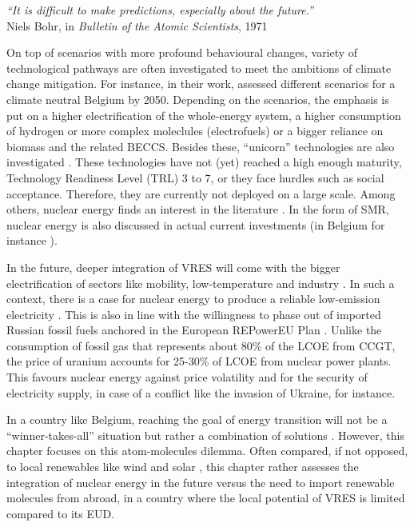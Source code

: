 \vspace{-0.2cm}
\begin{flushright}
\emph{``It is difficult to make predictions, especially about the future.''}\\
Niels Bohr, in \textit{Bulletin of the Atomic Scientists}, 1971
\end{flushright}
\vspace{0.4cm}

On top of scenarios with more profound behavioural changes, variety of technological pathways are often investigated to meet the ambitions of climate change mitigation. For instance, in their work, \citet{My2050} assessed different scenarios for a climate neutral Belgium by 2050. Depending on the scenarios, the emphasis is put on a higher electrification of the whole-energy system, a higher consumption of hydrogen or more complex moleclules (\ie electrofuels) or a bigger reliance on biomass and the related \gls{BECCS}. Besides these, ``unicorn'' technologies are also investigated \cite{heuberger2018impact}. These technologies have not (yet) reached a high enough maturity, \ie Technology Readiness Level (TRL) 3 to 7, or they face hurdles such as social acceptance. Therefore, they are currently not deployed on a large scale. Among others, nuclear energy finds an interest in the literature \cite{IEA_Nuclear_2022,PATHS2050}. In the form of \acrfull{SMR}, nuclear energy is also discussed in actual current investments (in Belgium for instance \cite{SMRlesoir}).

In the future, deeper integration of \gls{VRES} will come with the bigger electrification of sectors like mobility, low-temperature and industry \cite{IEA2023electrification}. In such a context, there is a case for nuclear energy to produce a reliable low-emission electricity \cite{IAEA2008}. This is also in line with the willingness to phase out of imported Russian fossil fuels anchored in the European REPowerEU Plan \cite{REPowerEU}. Unlike the consumption of fossil gas that represents about 80\% of the \gls{LCOE} from \gls{CCGT}, the price of uranium accounts for 25-30\% of \gls{LCOE} from nuclear power plants. This favours nuclear energy against price volatility and for the security of electricity supply, in case of a conflict like the invasion of Ukraine, for instance.

In a country like Belgium, reaching the goal of energy transition will not be a ``winner-takes-all'' situation but rather a combination of solutions \cite{Limpens2020,limpens2021generating}. However, this chapter focuses on this atom-molecules dilemma. Often compared, if not opposed, to local renewables like wind and solar \cite{suna2016nuclear,khatib2016economics}, this chapter rather assesses the integration of nuclear energy in the future versus the need to import renewable molecules from abroad, in a country where the local potential of \gls{VRES} is limited compared to its \gls{EUD}. 

